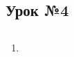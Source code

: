 \subsection{Урок №4}

\subsection*{}
\begin{multicols}{2}
    \begin{enumerate}\setlength{\itemsep}{0pt}
        \item
    \end{enumerate}
\end{multicols}

\subsection*{}

\begin{verbatim}
\end{verbatim}